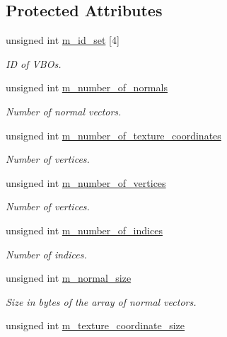 \subsection*{Protected Attributes}
\begin{DoxyCompactItemize}
\item 
unsigned int \hyperlink{class_graphics_1_1_v_b_o_a2070c3221265c092f68f8c970f225ddb}{m\_\-id\_\-set} \mbox{[}4\mbox{]}
\begin{DoxyCompactList}\small\item\em ID of VBOs. \end{DoxyCompactList}\item 
unsigned int \hyperlink{class_graphics_1_1_v_b_o_a1c096f3f5c8df8c7688450b70cb0e6cd}{m\_\-number\_\-of\_\-normals}
\begin{DoxyCompactList}\small\item\em Number of normal vectors. \end{DoxyCompactList}\item 
unsigned int \hyperlink{class_graphics_1_1_v_b_o_a085a9d24e4c8b1278730362ea34504e5}{m\_\-number\_\-of\_\-texture\_\-coordinates}
\begin{DoxyCompactList}\small\item\em Number of vertices. \end{DoxyCompactList}\item 
unsigned int \hyperlink{class_graphics_1_1_v_b_o_ac9ab09212702f66a1941cbd83dc109a6}{m\_\-number\_\-of\_\-vertices}
\begin{DoxyCompactList}\small\item\em Number of vertices. \end{DoxyCompactList}\item 
unsigned int \hyperlink{class_graphics_1_1_v_b_o_a251b1299ea9eb738c398b0f0f61264c7}{m\_\-number\_\-of\_\-indices}
\begin{DoxyCompactList}\small\item\em Number of indices. \end{DoxyCompactList}\item 
unsigned int \hyperlink{class_graphics_1_1_v_b_o_a57b327ff027f5565d207a6c0d1127f9c}{m\_\-normal\_\-size}
\begin{DoxyCompactList}\small\item\em Size in bytes of the array of normal vectors. \end{DoxyCompactList}\item 
unsigned int \hyperlink{class_graphics_1_1_v_b_o_ad764a9816e96edc1ed1659bcd64e9796}{m\_\-texture\_\-coordinate\_\-size}

\end{DoxyCompactItemize}
